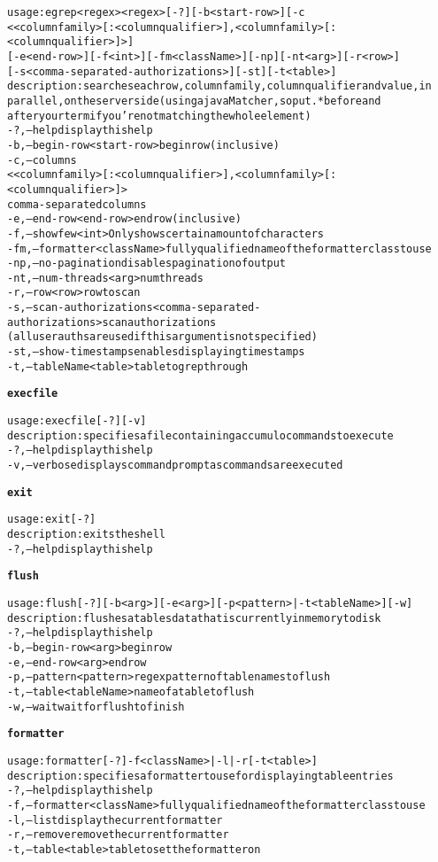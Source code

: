 \begin{alltt}
    usage: egrep <regex>{ <regex>} [-?] [-b <start-row>] [-c
              <<columnfamily>[:<columnqualifier>]{,<columnfamily>[:<columnqualifier>]}>]
              [-e <end-row>] [-f <int>] [-fm <className>] [-np] [-nt <arg>] [-r <row>]
              [-s <comma-separated-authorizations>] [-st] [-t <table>]
    description: searches each row, column family, column qualifier and value, in
              parallel, on the server side (using a java Matcher, so put .* before and
              after your term if you're not matching the whole element)
      -?,--help  display this help
      -b,--begin-row <start-row>  begin row (inclusive)
      -c,--columns
              <<columnfamily>[:<columnqualifier>]{,<columnfamily>[:<columnqualifier>]}> 
              comma-separated columns
      -e,--end-row <end-row>  end row (inclusive)
      -f,--show few <int>  Only shows certain amount of characters
      -fm,--formatter <className>  fully qualified name of the formatter class to use
      -np,--no-pagination  disables pagination of output
      -nt,--num-threads <arg>  num threads
      -r,--row <row>  row to scan
      -s,--scan-authorizations <comma-separated-authorizations>  scan authorizations
              (all user auths are used if this argument is not specified)
      -st,--show-timestamps  enables displaying timestamps
      -t,--tableName <table>  table to grep through

\textbf{execfile}

    usage: execfile [-?] [-v]
    description: specifies a file containing accumulo commands to execute
      -?,--help  display this help
      -v,--verbose  displays command prompt as commands are executed

\textbf{exit}

    usage: exit [-?]
    description: exits the shell
      -?,--help  display this help

\textbf{flush}

    usage: flush [-?] [-b <arg>] [-e <arg>] [-p <pattern> | -t <tableName>]  [-w]
    description: flushes a tables data that is currently in memory to disk
      -?,--help  display this help
      -b,--begin-row <arg>  begin row
      -e,--end-row <arg>  end row
      -p,--pattern <pattern>  regex pattern of table names to flush
      -t,--table <tableName>  name of a table to flush
      -w,--wait  wait for flush to finish

\textbf{formatter}

    usage: formatter [-?] -f <className> | -l | -r  [-t <table>]
    description: specifies a formatter to use for displaying table entries
      -?,--help  display this help
      -f,--formatter <className>  fully qualified name of the formatter class to use
      -l,--list  display the current formatter
      -r,--remove  remove the current formatter
      -t,--table <table>  table to set the formatter on


\end{alltt}

